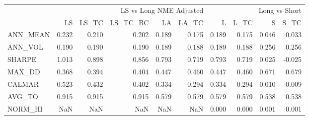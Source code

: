 \begin{tabular}{lrrrrrrrrr}
\toprule
 & \multicolumn{5}{r}{LS vs Long NME Adjusted} & \multicolumn{4}{r}{Long vs Short} \\
 & LS & LS\_TC & LS\_TC\_BC & LA & LA\_TC & L & L\_TC & S & S\_TC \\
\midrule
ANN\_MEAN & 0.232 & 0.210 & 0.202 & 0.189 & 0.175 & 0.189 & 0.175 & 0.046 & 0.033 \\
ANN\_VOL & 0.190 & 0.190 & 0.190 & 0.189 & 0.188 & 0.189 & 0.188 & 0.256 & 0.256 \\
SHARPE & 1.013 & 0.898 & 0.856 & 0.793 & 0.719 & 0.793 & 0.719 & 0.025 & -0.025 \\
MAX\_DD & 0.368 & 0.394 & 0.404 & 0.447 & 0.460 & 0.447 & 0.460 & 0.671 & 0.679 \\
CALMAR & 0.523 & 0.432 & 0.402 & 0.334 & 0.294 & 0.334 & 0.294 & 0.010 & -0.009 \\
AVG\_TO & 0.915 & 0.915 & 0.915 & 0.579 & 0.579 & 0.579 & 0.579 & 0.538 & 0.538 \\
NORM\_HI & NaN & NaN & NaN & NaN & NaN & 0.000 & 0.000 & 0.001 & 0.001 \\
\bottomrule
\end{tabular}
